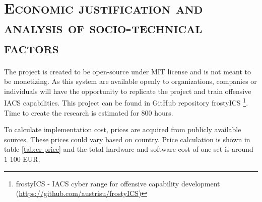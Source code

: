 
\chapter{\textsc{Economic justification and analysis of socio-technical factors}}



The project is created to be open-source under MIT license and is not meant to be monetizing. As this system are available openly to organizations, companies or individuals will have the opportunity to replicate the project and train offensive IACS capabilities. This project can be found in GitHub repository frostyICS \footnote{frostyICS - IACS cyber range for offensive capability development (\url{https://github.com/austrisu/frostyICS})}. Time to create the research is estimated for 800 hours.


To calculate implementation cost, prices are acquired from publicly available sources. These prices could vary based on country. Price calculation is shown in table \ref{tab:cr-price} and the total hardware and software cost of one set is around 1 100 EUR. 





